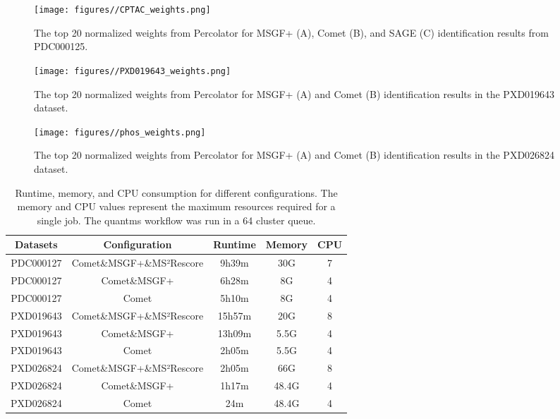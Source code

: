 \documentclass[12pt]{article}
\begin{document}
\begin{figure}[ht!]
	\centering
	\texttt{[image: figures//CPTAC\_weights.png]}
	\caption{The top 20 normalized weights from Percolator for MSGF+ (A), Comet (B), and SAGE (C) identification results from PDC000125.}
	\label{fig:PDC_ms2rescore_weights}
\end{figure}

\begin{figure}[ht!]
	\centering
	\texttt{[image: figures//PXD019643\_weights.png]}
	\caption{The top 20 normalized weights from Percolator for MSGF+ (A) and Comet (B) identification results in the PXD019643 dataset.}
	\label{fig:PXD019643_features}
\end{figure}
\begin{figure}[ht!]
	\centering
	\texttt{[image: figures//phos\_weights.png]}
	\caption{The top 20 normalized weights from Percolator for MSGF+ (A) and Comet (B) identification results in the PXD026824 dataset.}
	\label{fig:phospho_features}
\end{figure}


\renewcommand\thetable{S\arabic{table}}
\setcounter{table}{0}

\begin{table}[h!]
	\centering
	\caption{Runtime, memory, and CPU consumption for different configurations. The memory and CPU values represent the maximum resources required for a single job. The quantms workflow was  run in a 64 cluster queue.}
	\begin{tabular}{|c|c|c|c|c|}
		\hline
		Datasets & Configuration & Runtime& Memory & CPU \\
		\hline
		PDC000127 & Comet\&MSGF+\&MS²Rescore & 9h39m & 30G & 7 \\
		PDC000127 & Comet\&MSGF+ & 6h28m & 8G & 4 \\
		PDC000127 & Comet & 5h10m & 8G & 4 \\
		PXD019643 & Comet\&MSGF+\&MS²Rescore & 15h57m & 20G & 8 \\
		PXD019643 & Comet\&MSGF+ & 13h09m & 5.5G & 4 \\
		PXD019643 & Comet & 2h05m & 5.5G & 4 \\
		PXD026824 & Comet\&MSGF+\&MS²Rescore & 2h05m & 66G & 8 \\
		PXD026824 & Comet\&MSGF+ & 1h17m & 48.4G & 4 \\
		PXD026824 & Comet & 24m & 48.4G & 4 \\
		\hline
	\end{tabular}
	\label{tab:resources_stats}
\end{table}
\end{document}
